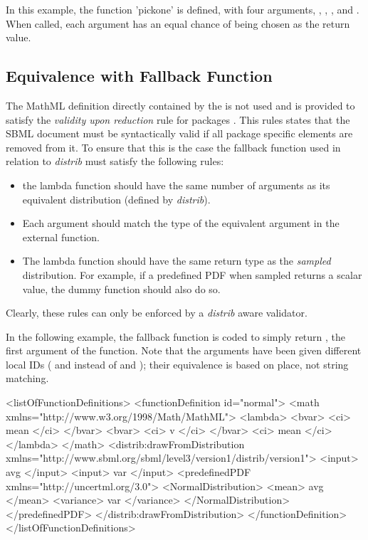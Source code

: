 \documentclass[draftspec]{sbmlpkgspec}
\newcommand{\distribshort}{\emph{distrib}\xspace}
\newcommand{\mathml}{MathML\xspace}
\begin{document}
In this example, the function 'pickone' is defined, with four arguments, , , , and .  When called, each argument has an equal chance of being chosen as the return value.


\subsection{Equivalence with Fallback Function}
\label{sec:fallbackfunc}

The \mathml definition directly contained by the
 is not used and is provided to
satisfy the \emph{validity upon reduction} rule for packages
\cite{sbmll3v1packrule}. This rules states that the SBML document must
be syntactically valid if all package specific elements are removed
from it. To ensure that this is the case the fallback function used in
relation to \distribshort must satisfy the following rules:

\begin{itemize}
\item the lambda function should have the same number of arguments as
  its equivalent distribution (defined by \distribshort).
\item Each argument should match the type of the equivalent argument
  in the external function.
\item The lambda function should have the same return type as the
  \emph{sampled} distribution. For example, if a predefined PDF when
  sampled returns a scalar value, the dummy function should also do so.
\end{itemize}

Clearly, these rules can only be enforced by a \distribshort aware validator.

In the following example, the fallback function is coded to simply return , the first argument of the function.  Note that the arguments have been given different local IDs ( and  instead of  and ); their equivalence is based on place, not string matching.

\begin{example}
  <listOfFunctionDefinitions>
    <functionDefinition id="normal">
      <math xmlns="http://www.w3.org/1998/Math/MathML">
        <lambda>
          <bvar>
            <ci> mean </ci>
          </bvar>
          <bvar>
            <ci> v </ci>
          </bvar>
          <ci> mean </ci>
        </lambda>
      </math>
      <distrib:drawFromDistribution
               xmlns="http://www.sbml.org/sbml/level3/version1/distrib/version1">
         <input> avg </input>
         <input> var </input>
         <predefinedPDF xmlns="http://uncertml.org/3.0">
           <NormalDistribution>
             <mean> avg </mean>
             <variance> var </variance>
           </NormalDistribution>
         </predefinedPDF>
      </distrib:drawFromDistribution>
    </functionDefinition>
  </listOfFunctionDefinitions>
\end{example}
\end{document}

